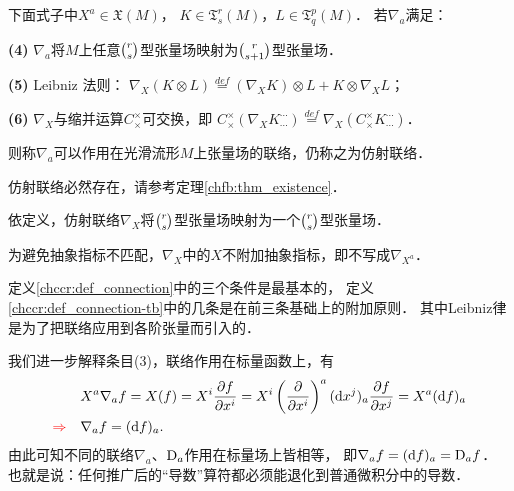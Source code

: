 \begin{definition}\label{chccr:def_connection-tb}
    下面式子中$ X^a\in \mathfrak{X}(M)$，
    $ K \in \mathfrak{T}^r_s(M) $，$ L \in \mathfrak{T}^p_q(M) $．
    若$\nabla_a$满足：
    
{\bfseries (4)} $\nabla_a$将$M$上任意$\binom{r}{s}$型张量场映射为$\binom{r}{s+1}$型张量场．

{\bfseries (5)} Leibniz 法则：
$\nabla_X(K\otimes L)\overset{def}{=} (\nabla_X K)\otimes L+ K\otimes \nabla_X L$；

{\bfseries (6)} $\nabla_X$与缩并运算$C^\times_\times$可交换，即
$C^\times_\times(\nabla_X K_{\cdots}^{\cdots}) \overset{def}{=} \nabla_X(C^\times_\times K_{\cdots}^{\cdots})$．
    
  
    则称$\nabla_a$可以作用在光滑流形$M$上张量场的联络，仍称之为仿射联络．
\end{definition}


\begin{remark}\label{chccr:rek_ccl}
    仿射联络必然存在，请参考定理\ref{chfb:thm_existence}．
\end{remark}
\begin{remark}
    依定义，仿射联络$\nabla_X$将$\binom{r}{s}$型张量场映射为一个$\binom{r}{s}$型张量场．
\end{remark}

\begin{remark}\label{chccr:rek_abstnoa}
    为避免抽象指标不匹配，$\nabla_X$中的$X$不附加抽象指标，即不写成$\nabla_{X^a}$．
\end{remark}

\begin{remark}
定义\ref{chccr:def_connection}中的三个条件是最基本的，
定义\ref{chccr:def_connection-tb}中的几条是在前三条基础上的附加原则．
其中Leibniz律是为了把联络应用到各阶张量而引入的．
\end{remark}

我们进一步解释条目(3)，联络作用在标量函数上，有
\begin{align}
    &X^a\nabla_a f = X(f) =
    X^i \frac{\partial f}{\partial x^i} =
    X^i \left(\frac{\partial }{\partial x^i}\right) ^a
    ({\rm d} x^j)_a \frac{\partial f}{\partial x^j} =
    X^a ({\rm d}f)_a  \notag \\
    {\color{red}\Rightarrow} \quad &
    \nabla_a f = ({\rm d}f)_a . \label{chccr:eqn_Df=df}
\end{align}
由此可知不同的联络$\nabla_a$、${\rm D}_a$作用在标量场上皆相等，
即$\nabla_a f = ({\rm d}f)_a={\rm D}_a f$．
也就是说：任何推广后的“导数”算符都必须能退化到普通微积分中的导数．





